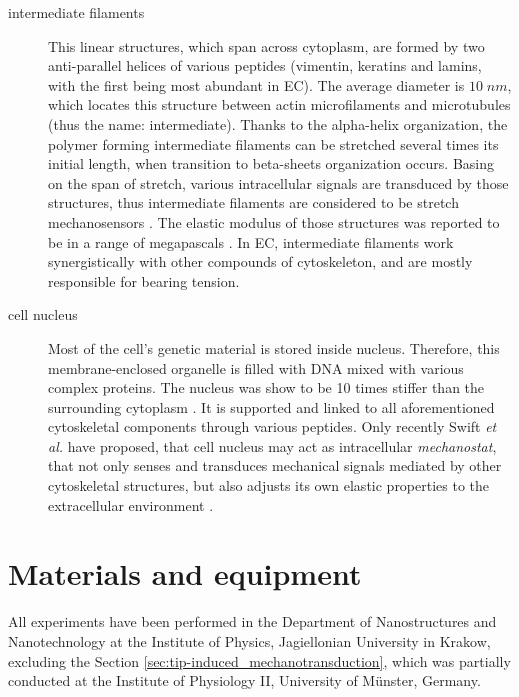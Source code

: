 \begin{description}
\item[intermediate filaments] This linear structures, which span across cytoplasm, are formed by two anti-parallel helices of various peptides (vimentin, keratins and lamins, with the first being most abundant in \gls{EC}). The average diameter is $10\;nm$, which locates this structure between actin microfilaments and microtubules (thus the name: intermediate). Thanks to the alpha-helix organization, the polymer forming intermediate filaments can be stretched several times its initial length, when transition to beta-sheets organization occurs. Basing on the span of stretch, various intracellular signals are transduced by those structures, thus intermediate filaments are considered to be stretch mechanosensors \cite{Qin2009}. The elastic modulus of those structures was reported to be in a range of megapascals \cite{Herrmann2007}. In \gls{EC}, intermediate filaments work synergistically with other compounds of cytoskeleton, and are mostly responsible for bearing tension.
\item[cell nucleus] Most of the cell's genetic material is stored inside nucleus. Therefore, this membrane-enclosed organelle is filled with DNA mixed with various complex proteins. The nucleus was show to be 10 times stiffer than the surrounding cytoplasm \cite{Martins2012}. It is supported and linked to all aforementioned cytoskeletal components through various peptides. Only recently Swift \emph{et al.} have proposed, that cell nucleus may act as intracellular \emph{mechanostat}, that not only senses and transduces mechanical signals mediated by other cytoskeletal structures, but also adjusts its own elastic properties to the extracellular environment \cite{Swift2013}.
\end{description}

\section{Materials and equipment}
All experiments have been performed in the Department of Nanostructures and Nanotechnology at the Institute of Physics, Jagiellonian University in Krakow, excluding the Section \ref{sec:tip-induced_mechanotransduction}, which was partially conducted at the Institute of Physiology II, University of M\"{u}nster, Germany.
